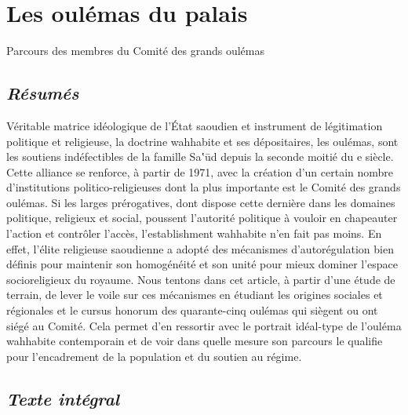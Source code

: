 

\section{Les oulémas du palais}
\label{Art:OulemasPalais}
Parcours des membres du Comité des grands oulémas

\hypertarget{ruxe9sumuxe9s}{%
\subsection{\texorpdfstring{\emph{Résumés}}{Résumés}}\label{ruxe9sumuxe9s}}


Véritable matrice idéologique de l'État saoudien et instrument de
légitimation politique et religieuse, la doctrine wahhabite et ses
dépositaires, les oulémas, sont les soutiens indéfectibles de la famille
Sa‛ūd depuis la seconde moitié du e siècle. Cette alliance se renforce,
à partir de 1971, avec la création d'un certain nombre d'institutions
politico-religieuses dont la plus importante est le Comité des grands
oulémas. Si les larges prérogatives, dont dispose cette dernière dans
les domaines politique, religieux et social, poussent l'autorité
politique à vouloir en chapeauter l'action et contrôler l'accès,
l'establishment wahhabite n'en fait pas moins. En effet, l'élite
religieuse saoudienne a adopté des mécanismes d'autorégulation bien
définis pour maintenir son homogénéité et son unité pour mieux dominer
l'espace socioreligieux du royaume. Nous tentons dans cet article, à
partir d'une étude de terrain, de lever le voile sur ces mécanismes en
étudiant les origines sociales et régionales et le cursus honorum des
quarante-cinq oulémas qui siègent ou ont siégé au Comité. Cela permet
d'en ressortir avec le portrait idéal-type de l'ouléma wahhabite
contemporain et de voir dans quelle mesure son parcours le qualifie pour
l'encadrement de la population et du soutien au régime.

\hypertarget{texte-intuxe9gral}{%
\subsection{\texorpdfstring{\emph{Texte
intégral}}{Texte intégral}}\label{texte-intuxe9gral}}

